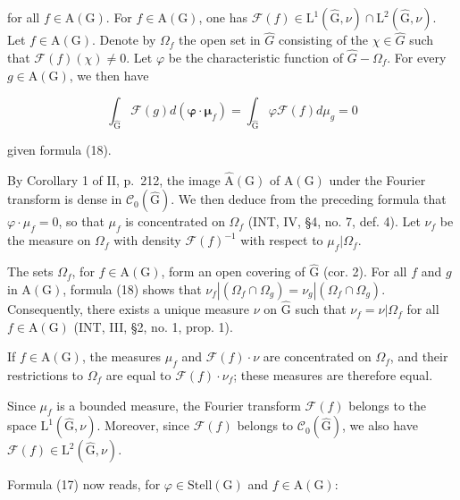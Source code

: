 for all \(f \in \mathrm{A}(\mathrm{G})\). For \(f \in \mathrm{A}(\mathrm{G})\), one has \(\mathcal{F}(f) \in \mathrm{L}^{1}(\widehat{\mathrm{G}}, \nu) \cap \mathrm{L}^{2}(\widehat{\mathrm{G}}, \nu)\). Let \(f \in \mathrm{A}(\mathrm{G})\). Denote by \(\Omega_{f}\) the open set in \(\widehat{G}\) consisting of the \(\chi \in \widehat{G}\) such that \(\mathcal{F}(f)(\chi) \neq 0\). Let \(\varphi\) be the characteristic function of \(\widehat{G} - \Omega_{f}\). For every \(g \in \mathrm{A}(\mathrm{G})\), we then have

\[
\int_ {\widehat {\mathrm{G}}} \mathcal {F} (g) d (\boldsymbol {\varphi} \cdot \boldsymbol {\mu} _ {f}) = \int_ {\widehat {\mathrm{G}}} \varphi \mathcal {F} (f) d \mu_ {g} = 0
\]

given formula (18).

By Corollary 1 of II, p.~212, the image \(\widehat{\mathrm{A}}(\mathrm{G})\) of \(\mathrm{A}(\mathrm{G})\) under the Fourier transform is dense in \(\mathcal{C}_0(\widehat{\mathrm{G}})\). We then deduce from the preceding formula that \(\varphi \cdot \mu_f = 0\), so that \(\mu_f\) is concentrated on \(\Omega_f\) (INT, IV, §4, no. 7, def. 4). Let \(\nu_f\) be the measure on \(\Omega_f\) with density \(\mathcal{F}(f)^{-1}\) with respect to \(\mu_f|\Omega_f\).

The sets \(\Omega_f\), for \(f \in \mathrm{A}(\mathrm{G})\), form an open covering of \(\widehat{\mathrm{G}}\) (cor. 2). For all \(f\) and \(g\) in \(\mathrm{A}(\mathrm{G})\), formula (18) shows that \(\nu_f|(\Omega_f \cap \Omega_g) = \nu_g|(\Omega_f \cap \Omega_g)\). Consequently, there exists a unique measure \(\nu\) on \(\widehat{\mathrm{G}}\) such that \(\nu_f = \nu|\Omega_f\) for all \(f \in \mathrm{A}(\mathrm{G})\) (INT, III, §2, no. 1, prop. 1).

If \(f \in \mathrm{A}(\mathrm{G})\), the measures \(\mu_f\) and \(\mathcal{F}(f) \cdot \nu\) are concentrated on \(\Omega_f\), and their restrictions to \(\Omega_f\) are equal to \(\mathcal{F}(f) \cdot \nu_f\); these measures are therefore equal.

Since \(\mu_f\) is a bounded measure, the Fourier transform \(\mathcal{F}(f)\) belongs to the space \(\mathrm{L}^1 (\widehat{\mathrm{G}},\nu)\). Moreover, since \(\mathcal{F}(f)\) belongs to \(\mathcal{C}_0(\widehat{\mathrm{G}})\), we also have \(\mathcal{F}(f)\in \mathrm{L}^2 (\widehat{\mathrm{G}},\nu)\).

Formula (17) now reads, for \(\varphi\in\mathrm{Stell}(\mathrm{G})\) and \(f\in\mathrm{A}(\mathrm{G})\):

